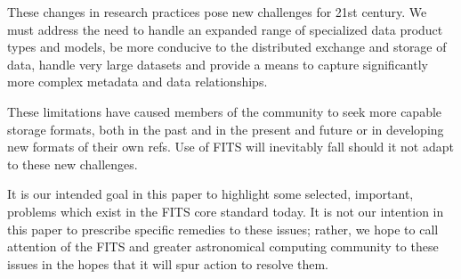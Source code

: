 \documentclass[11pt,twoside]{article}
\begin{document}
These changes in research practices pose new challenges for 21st
century. We must address the need to handle an expanded range of
specialized data product types and models, be more conducive to the
distributed exchange and storage of data, handle very large datasets
and provide a means to capture significantly more complex metadata and
data relationships.

These limitations have caused members of the community to seek more
capable storage formats, both in the past \citep[e.g.\ Starlink
HDS;][]{1982QJRAS..23..485D} and in the present and future
\citep[e.g.\ LOFAR][]{2011ASPC..442...53A} or in developing new
formats of their own {refs}. Use of FITS will inevitably fall should
it not adapt to these new challenges.

It is our intended goal in this paper to highlight some selected,
important, problems which exist in the FITS core standard today. It is
not our intention in this paper to prescribe specific remedies to
these issues; rather, we hope to call attention of the FITS and
greater astronomical computing community to these issues in the hopes
that it will spur action to resolve them.




\end{document}
